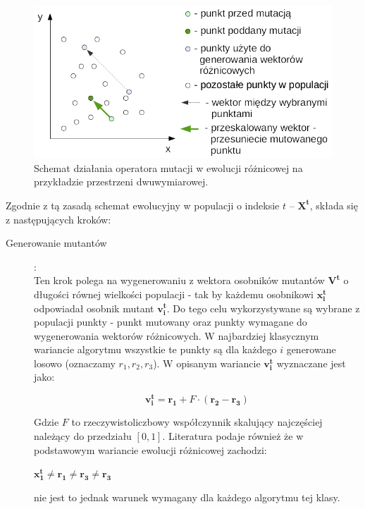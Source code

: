 \documentclass[12pt,a4paper]{report}
\begin{document}
{{%
\begin{figure}[h]
\begin{center}\includegraphics[scale=0.8]{img/BasicMutationSchema.png}\end{center}
\caption{Schemat działania operatora mutacji w ewolucji różnicowej na przykładzie przestrzeni dwuwymiarowej.}
\label{DEvolMutationBasic}
\end{figure}


\par{
Zgodnie z tą zasadą schemat ewolucyjny w populacji o indeksie ${t}$ -- $\mathbf{X^t}$, składa się z następujących kroków:
}

\par{
	\begin{description}
	
	
  		\item[Generowanie mutantów]:\\
  Ten krok polega na wygenerowaniu z wektora osobników mutantów $\mathbf{V^{t}}$ o długości równej wielkości populacji - tak by każdemu osobnikowi $\mathbf{x_i^{t}}$ odpowiadał osobnik mutant $\mathbf{v_i^{t}}$.
  Do tego celu wykorzystywane są wybrane z populacji punkty - punkt mutowany oraz punkty wymagane do wygenerowania wektorów różnicowych. W najbardziej klasycznym wariancie algorytmu wszystkie te punkty są dla każdego $i$ generowane losowo \cite{SpringerIntroToEvol} (oznaczamy $r_1, r_2, r_3$).
  W opisanym wariancie $\mathbf{v_i^{t}}$ wyznaczane jest jako:

\begin{equation} \label{eq:DiffMutation}
 \mathbf{v_i^{t}} = \mathbf{r_1} + F \cdot (\mathbf{r_2} - \mathbf{r_3})
\end{equation}

Gdzie $F$ to rzeczywistoliczbowy współczynnik skalujący najczęściej należący do przedziału $[0, 1]$. Literatura \cite{SpringerIntroToEvol} podaje również że w podstawowym wariancie ewolucji różnicowej zachodzi:
\begin{center}
 $\mathbf{x_1^{t}} \neq \mathbf{r_1} \neq \mathbf{r_3} \neq \mathbf{r_3}$
\end{center}
nie jest to jednak warunek wymagany dla każdego algorytmu tej klasy.



\end{description}}}}
\end{document}
